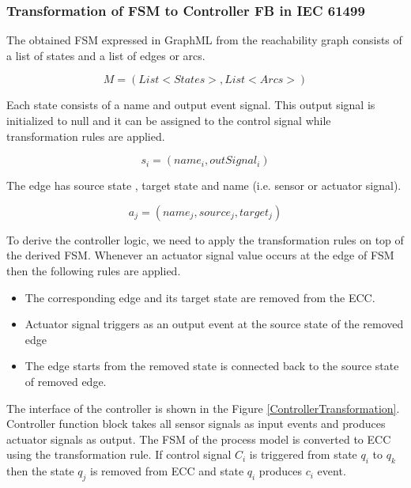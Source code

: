 \documentclass[conference]{IEEEtran}
\begin{document}
\hfill
\subsubsection{Transformation of FSM to Controller FB in IEC 61499}
\hfill

The obtained  FSM expressed in GraphML  from the reachability graph consists of a list of states and a list of  edges or arcs.

  \begin{equation}\label{eqn:1}
    M = (List<States>,List<Arcs>)
  \end{equation}
  
Each state consists of a name and output event signal. This output signal is initialized to null and it can be assigned to the control signal while transformation rules are applied. 

  \begin{equation}\label{eqn:2}
    s_i = (name_i, outSignal_i ) 
  \end{equation}
 
 The edge has source state , target state and name (i.e. sensor or actuator signal).
 
   \begin{equation}\label{eqn:3}
     a_j = (name_j, source_j, target_j)
  \end{equation}
 
 To derive the controller logic, we need to apply the transformation rules on top of the derived FSM. Whenever an actuator signal value occurs at the edge of FSM then the following rules are applied.


\begin{itemize}
  \item The corresponding edge and its target state are removed from the ECC.
  \item  Actuator signal triggers as an output event at the source state of the removed edge
  \item The edge starts from the removed state  is connected back to the source state of removed edge.
\end{itemize}


The interface of the controller is shown in the Figure \ref{ControllerTransformation}. Controller function block takes all sensor signals as input events and  produces actuator signals as output. The FSM of the process model is converted to ECC using the transformation rule. If control signal $C_i$ is triggered from state $q_i$ to $q_k$ then the  state $q_j$ is removed  from ECC  and state $q_i$ produces $c_i$ event. 
\end{document}
